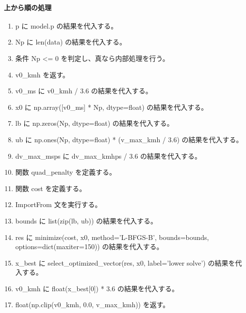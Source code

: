 \documentclass[a4paper,11pt]{article}
\begin{document}
            \paragraph{上から順の処理}
            \begin{enumerate}[leftmargin=1.8em]
            \item p に model.p の結果を代入する。
\item Np に len(data) の結果を代入する。
\item 条件 Np <= 0 を判定し、真なら内部処理を行う。
\item   v0\_kmh を返す。
\item v0\_ms に v0\_kmh / 3.6 の結果を代入する。
\item x0 に np.array([v0\_ms] * Np, dtype=float) の結果を代入する。
\item lb に np.zeros(Np, dtype=float) の結果を代入する。
\item ub に np.ones(Np, dtype=float) * (v\_max\_kmh / 3.6) の結果を代入する。
\item dv\_max\_msps に dv\_max\_kmhps / 3.6 の結果を代入する。
\item 関数 quad\_penalty を定義する。
\item 関数 cost を定義する。
\item ImportFrom 文を実行する。
\item bounds に list(zip(lb, ub)) の結果を代入する。
\item res に minimize(cost, x0, method='L-BFGS-B', bounds=bounds, options=dict(maxiter=150)) の結果を代入する。
\item x\_best に select\_optimized\_vector(res, x0, label='lower solve') の結果を代入する。
\item v0\_kmh に float(x\_best[0]) * 3.6 の結果を代入する。
\item float(np.clip(v0\_kmh, 0.0, v\_max\_kmh)) を返す。
            \end{enumerate}
\end{document}
